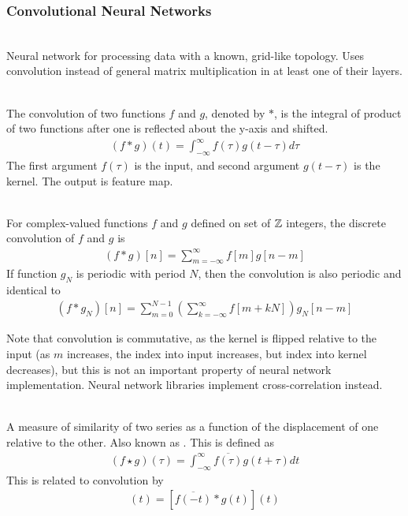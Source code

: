 \subsubsection{Convolutional Neural Networks}

\begin{definition} \\
Neural network for processing data with a known, grid-like topology. Uses convolution instead of general matrix multiplication in at least one of their layers.
\end{definition}

\begin{definition} \\
The convolution of two functions $f$ and $g$, denoted by $\ast$, is the integral of product of two functions after one is reflected about the y-axis and shifted.
\begin{align}
(f \ast g)(t) = \int_{-\infty}^{\infty} f(\tau)g(t - \tau) d \tau \nonumber
\end{align} 
The first argument $f(\tau)$ is the input, and second argument $g(t - \tau)$ is the kernel. The output is feature map.
\end{definition}

\begin{definition} \\
For complex-valued functions $f$ and $g$ defined on set of $\mathbb{Z}$ integers, the discrete convolution of $f$ and $g$ is
\begin{align}
(f \ast g)[n] = \sum\limits_{m=-\infty}^{\infty} f[m] g[n-m] \nonumber
\end{align}
If function $g_N$ is periodic with period $N$, then the convolution is also periodic and identical to
\begin{align}
(f \ast g_N)[n] = \sum\limits_{m=0}^{N-1} \left( \sum\limits_{k=-\infty}^{\infty} f[m+kN] \right) g_N [n-m] \nonumber
\end{align}
\end{definition}

Note that convolution is commutative, as the kernel is flipped relative to the input (as $m$ increases, the index into input increases, but index into kernel decreases), but this is not an important property of neural network implementation. Neural network libraries implement cross-correlation instead.

\begin{definition} \\
A measure of similarity of two series as a function of the displacement of one relative to the other. Also known as . This is defined as
\begin{align}
(f \star g)(\tau) = \int_{-\infty}^{\infty} \overline{f(\tau)}g(t + \tau) dt \nonumber
\end{align}
This is related to convolution by
\begin{align}
[f(t) \star g{t}](t) = [\overline{f(-t)} \ast g(t)] (t) \nonumber
\end{align}
\end{definition}

